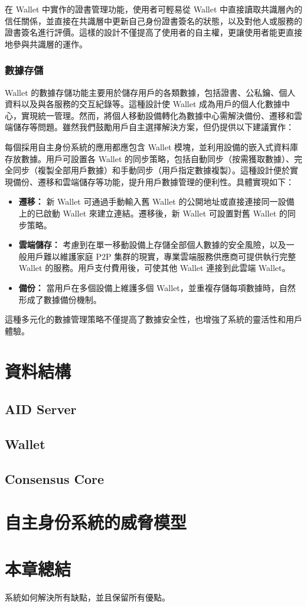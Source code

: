 在 Wallet 中實作的證書管理功能，使用者可輕易從 Wallet 中直接讀取共識層內的信任關係，並直接在共識層中更新自己身份證書簽名的狀態，以及對他人或服務的證書簽名進行評價。這樣的設計不僅提高了使用者的自主權，更讓使用者能更直接地參與共識層的運作。
\subsubsection{數據存儲}
Wallet 的數據存儲功能主要用於儲存用戶的各類數據，包括證書、公私鑰、個人資料以及與各服務的交互紀錄等。這種設計使 Wallet 成為用戶的個人化數據中心，實現統一管理。然而，將個人移動設備轉化為數據中心需解決備份、遷移和雲端儲存等問題。雖然我們鼓勵用戶自主選擇解決方案，但仍提供以下建議實作：

每個採用自主身份系統的應用都應包含 Wallet 模塊，並利用設備的嵌入式資料庫存放數據。用戶可設置各 Wallet 的同步策略，包括自動同步（按需獲取數據）、完全同步（複製全部用戶數據）和手動同步（用戶指定數據複製）。這種設計便於實現備份、遷移和雲端儲存等功能，提升用戶數據管理的便利性。具體實現如下：
\begin{itemize}
  \item \textbf{遷移：} 新 Wallet 可通過手動輸入舊 Wallet 的公開地址或直接連接同一設備上的已啟動 Wallet 來建立連結。遷移後，新 Wallet 可設置對舊 Wallet 的同步策略。
  \item \textbf{雲端儲存：} 考慮到在單一移動設備上存儲全部個人數據的安全風險，以及一般用戶難以維護家庭 P2P 集群的現實，專業雲端服務供應商可提供執行完整 Wallet 的服務。用戶支付費用後，可使其他 Wallet 連接到此雲端 Wallet。
  \item \textbf{備份：} 當用戶在多個設備上維護多個 Wallet，並重複存儲每項數據時，自然形成了數據備份機制。
\end{itemize}
這種多元化的數據管理策略不僅提高了數據安全性，也增強了系統的靈活性和用戶體驗。
\section{資料結構}
\subsection{AID Server}
\subsection{Wallet}
\subsection{Consensus Core}
\section{自主身份系統的威脅模型}
\section{本章總結}
系統如何解決所有缺點，並且保留所有優點。
